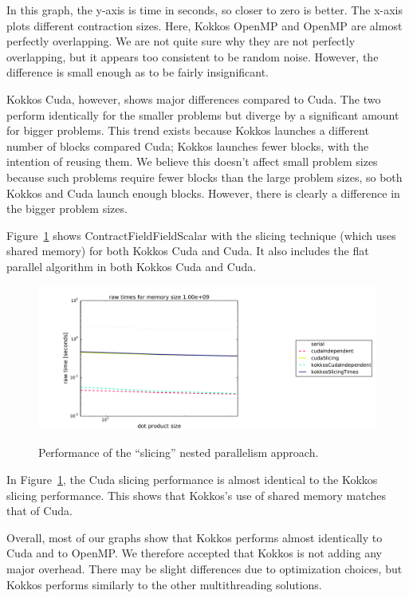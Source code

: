 In this graph, the y-axis is time in seconds, so closer to zero is better. The
x-axis plots different contraction sizes.  Here, Kokkos OpenMP and OpenMP are
almost perfectly overlapping. We are not quite sure why they are not perfectly
overlapping, but it appears too consistent to be random noise. However, the
difference is small enough as to be fairly insignificant. 

Kokkos Cuda, however, shows major differences compared to Cuda. The two perform
identically for the smaller problems but diverge by a significant amount for
bigger problems. This trend exists because Kokkos launches a different number of
blocks compared Cuda; Kokkos launches fewer blocks, with the intention of
reusing them.  We believe this doesn't affect small problem sizes because such
problems require fewer blocks than the large problem sizes, so both Kokkos and
Cuda launch enough blocks.  However, there is clearly a difference in the bigger
problem sizes. 

Figure~\ref{fig:cffscomparison} shows ContractFieldFieldScalar with the slicing
technique (which uses shared memory) for both Kokkos Cuda and Cuda.  It also
includes the flat parallel algorithm in both Kokkos Cuda and Cuda.

\begin{figure}[!ht]
{\includegraphics[scale=.4]{CFFS_RawTimes_2d_largest_Comparison.pdf}}
\caption[ContractFieldFieldScalar Kokkos performance comparison]{
    Performance of the ``slicing'' nested parallelism approach.}
\label{fig:cffscomparison}
\end{figure}

In Figure~\ref{fig:cffscomparison}, the Cuda slicing performance is almost
identical to the Kokkos slicing performance. This shows that Kokkos's use of
shared memory matches that of Cuda.

Overall, most of our graphs show that Kokkos performs almost identically to Cuda
and to OpenMP.  We therefore accepted that Kokkos is not adding any major
overhead. There may be slight differences due to optimization choices, but
Kokkos performs similarly to the other multithreading solutions.

